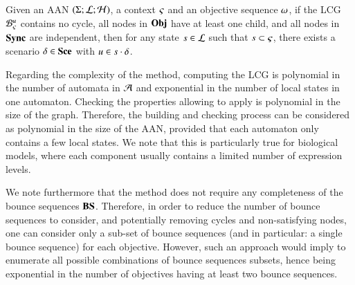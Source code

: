 \begin{theorem}
\label{th:approxinf}
  Given an AAN $(\Sigma; \mathcal{L}; \mathcal{H})$,
  a context $\varsigma$ and an objective sequence $\omega$,
  if the LCG ${\mathcal{B}_{\varsigma}^{u}}$ contains no cycle,
  all nodes in $\mathbf{Obj}$ have at least one child,
  and all nodes in $\mathbf{Sync}$ are independent,
  then for any state $s\in\mathcal{L}$ such that $s\subset\varsigma$,
  there exists a scenario $\delta\in\mathbf{Sce}$ with $u\in s\cdot\delta$.
\end{theorem}

Regarding the complexity of the method,
computing the LCG is polynomial in the number of automata in $\mathcal{A}$ and exponential in the number of local states in one automaton.
Checking the properties allowing to apply  is polynomial in the size of the graph.
Therefore, the building and checking process can be considered as polynomial in the size
of the AAN, provided that each automaton only contains a few local states.
We note that this is particularly true for biological models, where
each component usually contains a limited number of expression levels.

We note furthermore that the method does not require any completeness of the bounce sequences
$\mathbf{BS}$.
Therefore, in order to reduce the number of bounce sequences to consider, and potentially removing
cycles and non-satisfying nodes,
one can consider only a sub-set of bounce sequences
(and in particular: a single bounce sequence) for each objective.
However, such an approach would imply to enumerate all possible combinations of bounce sequences
subsets, hence being exponential in the number of objectives having at least two bounce sequences.



